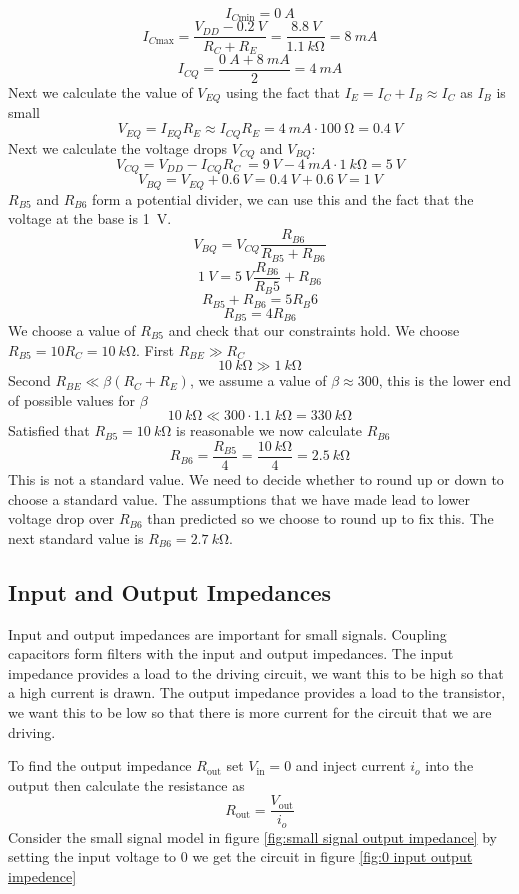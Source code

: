 \documentclass{article}
\begin{document}
    \[I_{C\text{min}} = \SI{0}{A}\]
    \[I_{C\text{max}} = \frac{V_{DD} - \SI{0.2}{V}}{R_C + R_E} = \frac{\SI{8.8}{V}}{\SI{1.1}{k\ohm}} = \SI{8}{mA}\]
    \[I_{CQ} = \frac{\SI{0}{A} + \SI{8}{mA}}{2} = \SI{4}{mA}\]
    Next we calculate the value of \(V_{EQ}\) using the fact that \(I_E = I_C + I_B\approx I_C\) as \(I_B\) is small
    \[V_{EQ} = I_{EQ}R_E\approx I_{CQ}R_E = \SI{4}{mA}\cdot\SI{100}{\ohm} = \SI{0.4}{V}\]
    Next we calculate the voltage drops \(V_{CQ}\) and \(V_{BQ}\):
    \[V_{CQ} = V_{DD} - I_{CQ}R_C\ = \SI{9}{V} - \SI{4}{mA}\cdot\SI{1}{k\ohm} = \SI{5}{V}\]
    \[V_{BQ} = V_{EQ} + \SI{0.6}{V} = \SI{0.4}{V} + \SI{0.6}{V} = \SI{1}{V}\]
    \(R_{B5}\) and \(R_{B6}\) form a potential divider, we can use this and the fact that the voltage at the base is \SI{1}{V}.
    \[V_{BQ} = V_{CQ}\frac{R_{B6}}{R_{B5} + R_{B6}}\]
    \[\SI{1}{V} = \SI{5}{V}\frac{R_{B6}}{R_B5} + R_{B6}\]
    \[R_{B5} + R_{B6}= 5R_B6\]
    \[R_{B5} = 4R_{B6}\]
    We choose a value of \(R_{B5}\) and check that our constraints hold.
    We choose \(R_{B5} = 10R_C = \SI{10}{k\ohm}\).
    First \(R_{BE}\gg R_C\) 
    \[\SI{10}{k\ohm}\gg \SI{1}{k\ohm}\]
    Second \(R_{BE} \ll \beta(R_C + R_E)\), we assume a value of \(\beta \approx 300\), this is the lower end of possible values for \(\beta\)
    \[\SI{10}{k\ohm} \ll 300\cdot\SI{1.1}{k\ohm} = \SI{330}{k\ohm}\]
    Satisfied that \(R_{B5} = \SI{10}{k\ohm}\) is reasonable we now calculate \(R_{B6}\)
    \[R_{B6} = \frac{R_{B5}}{4} = \frac{\SI{10}{k\ohm}}{4} = \SI{2.5}{k\ohm}\]
    This is not a standard value.
    We need to decide whether to round up or down to choose a standard value.
    The assumptions that we have made lead to lower voltage drop over \(R_{B6}\) than predicted so we choose to round up to fix this. 
    The next standard value is \(R_{B6} = \SI{2.7}{k\ohm}\).
    
    \subsection{Input and Output Impedances}
    Input and output impedances are important for small signals.
    Coupling capacitors form filters with the input and output impedances.
    The input impedance provides a load to the driving circuit, we want this to be high so that a high current is drawn.
    The output impedance provides a load to the transistor, we want this to be low so that there is more current for the circuit that we are driving.
    
    To find the output impedance \(R_\text{out}\) set \(V_\text{in} = 0\) and inject current \(i_o\) into the output then calculate the resistance as
    \[R_\text{out} = \frac{V_\text{out}}{i_o}\]
    Consider the small signal model in figure \ref{fig:small signal output impedance} by setting the input voltage to 0 we get the circuit in figure \ref{fig:0 input output impedence}
    
\end{document}
